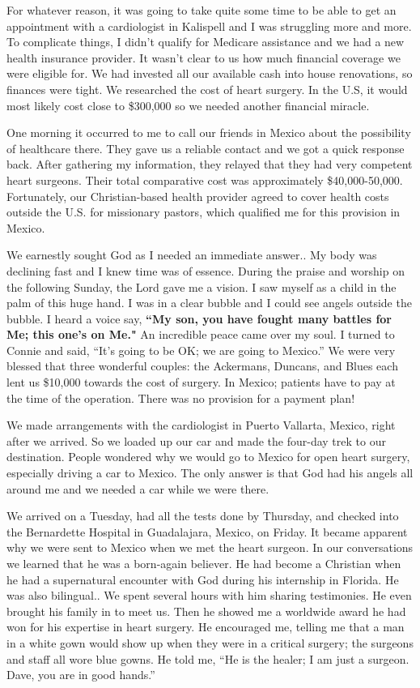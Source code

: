 \documentclass[twoside, 12pt]{book}
\begin{document}
For whatever reason, it was going to take quite some time to be able to get an appointment with a cardiologist in Kalispell and I was struggling more and more. To complicate things, I didn’t qualify for Medicare assistance and we had a new health insurance provider. It wasn’t clear to us how much financial coverage we were eligible for. We had invested all our available cash into house renovations, so finances were tight. We researched the cost of heart surgery. In the U.S, it would most likely cost close to \$300,000 so we needed another financial miracle.

One morning it occurred to me to call our friends in Mexico about the possibility of healthcare there. They gave us a reliable contact and we got a quick response back. After gathering my information, they relayed that they had very competent heart surgeons. Their total comparative cost was approximately \$40,000-50,000. Fortunately, our Christian-based health provider agreed to cover health costs outside the U.S. for missionary pastors, which qualified me for this provision in Mexico. 

We earnestly sought God as I needed an immediate answer.. My body was declining fast and I knew time was of essence. During the praise and worship on the following Sunday, the Lord gave me a vision. I saw myself as a child in the palm of this huge hand. I was in a clear bubble and I could see angels outside the bubble. I heard a voice say, \textbf{``My son, you have fought many battles for Me; this one's on Me."}   An incredible peace came over my soul. I turned to Connie and said, “It’s going to be OK; we are going to Mexico.” We were very blessed that three wonderful couples: the Ackermans, Duncans, and Blues each lent us \$10,000 towards the cost of surgery. In Mexico; patients have to pay at the time of the operation. There was no provision for a payment plan!

We made arrangements with the cardiologist in Puerto Vallarta, Mexico, right after we arrived. So we loaded up our car and made the four-day trek to our destination. People wondered why we would go to Mexico for open heart surgery, especially driving a car to Mexico. The only answer is that God had his angels all around me and we needed a car while we were there.

We arrived on a Tuesday, had all the tests done by Thursday, and checked into the Bernardette Hospital in Guadalajara, Mexico, on Friday. It became apparent why we were sent to Mexico when we met the heart surgeon. In our conversations we learned that he was a born-again believer. He had become a Christian when he had a supernatural encounter with God during his internship in Florida. He was also bilingual.. We spent several hours with him sharing testimonies. He even brought his family in to meet us. Then he showed me a worldwide award he had won for his expertise in heart surgery. He encouraged me, telling me that a man in a white gown would show up when they were in a critical surgery; the surgeons and staff all wore blue gowns. He told me, “He is the healer; I am just a surgeon. Dave, you are in good hands.”
\end{document}
